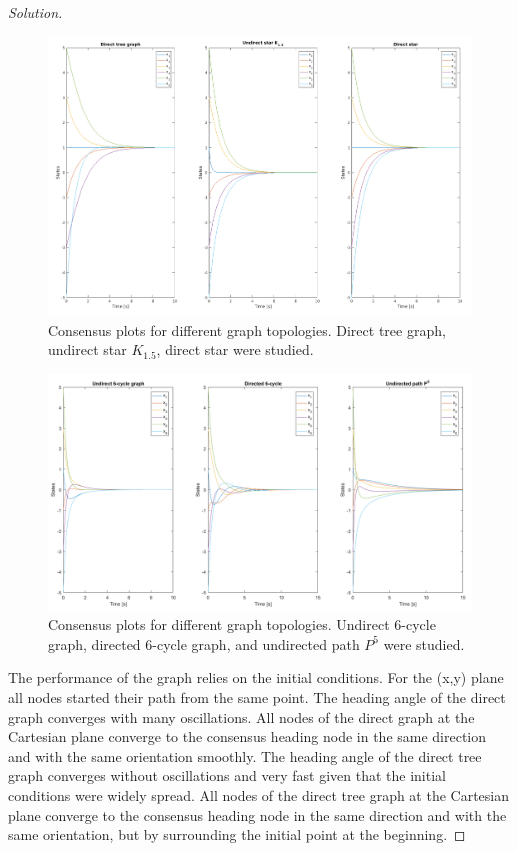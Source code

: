 \documentclass[12pt]{article}
\newenvironment{solution}{\begin{proof}[Solution]}{\end{proof}}
\begin{document}
\begin{solution}
\begin{figure}[!h]
	\includegraphics[scale=0.24]{figures/ConsensusGraphTopologies2.png}
	\centering
	\caption{Consensus plots for different graph topologies. Direct tree graph, undirect star $K_{1.5}$, direct star were studied.}
	\label{cgt2}
\end{figure}
\begin{figure}[!h]
	\includegraphics[scale=0.315]{figures/ConsensusGraphTopologies3.png}
	\centering
	\caption{Consensus plots for different graph topologies. Undirect 6-cycle graph, directed 6-cycle graph, and undirected path $P^5$ were studied.}
	\label{cgt3}
\end{figure}




The performance of the graph relies on the initial conditions. For the (x,y) plane all nodes started their path from the same point. The heading angle of the direct graph converges with many oscillations. All nodes of the direct graph at the Cartesian plane converge to the consensus heading node in the same direction and with the same orientation smoothly. The heading angle of the direct tree graph converges without oscillations and very fast given that the initial conditions were widely spread. All nodes of the direct tree graph at the Cartesian plane converge to the consensus heading node in the same direction and with the same orientation, but by surrounding the initial point at the beginning. 


\end{solution}
\end{document}

